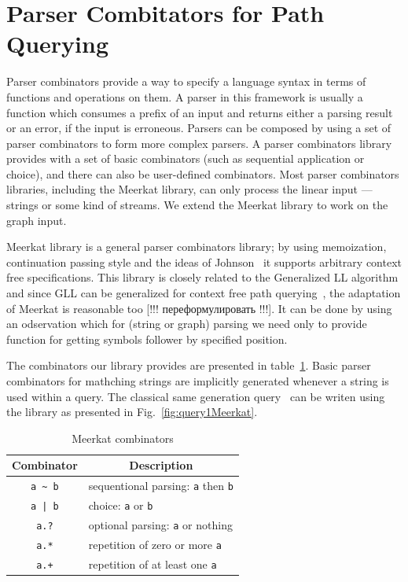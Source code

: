  \section{Parser Combitators for Path Querying}

Parser combinators provide a way to specify a language syntax in terms of functions and operations on them. 
A parser in this framework is usually a function which consumes a prefix of an input and returns either a parsing result or an error, if the input is erroneous. 
Parsers can be composed by using a set of parser combinators to form more complex parsers. 
A parser combinators library provides with a set of basic combinators (such as sequential application or choice), and there can also be user-defined combinators. 
Most parser combinators libraries, including the Meerkat library, can only process the linear input --- strings or some kind of streams. 
We extend the Meerkat library to work on the graph input.

Meerkat library is a general parser combinators library; by using memoization, continuation passing style and the ideas of Johnson~\cite{Johnson} it supports arbitrary context free specifications. 
This library is closely related to the Generalized LL algorithm and since GLL can be generalized for context free path querying~\cite{GrigorevR16}, the adaptation of Meerkat is reasonable too [!!! переформулировать !!!]. 
It can be done by using an odservation which for (string or graph) parsing we need only to provide function for getting symbols follower by specified position.

The combinators our library provides are presented in table~\ref{table:combinators}. 
Basic parser combinators for mathching strings are implicitly generated whenever a string is used within a query. 
The classical same generation query~\cite{FndDB} can be writen using the library as presented in Fig.~\ref{fig:query1Meerkat}.

\begin{table}[h]
\centering
\begin{tabular}{c|l}
\multicolumn{1}{c|}{Combinator} & \multicolumn{1}{|c}{Description} \\ \hline
{\lstinline!a ~ b!} & sequentional parsing: {\lstinline!a!} then {\lstinline!b!}   \\
{\lstinline!a | b!} & choice: {\lstinline!a!} or {\lstinline!b!}         \\
{\lstinline!a.?!}   & optional parsing: {\lstinline!a!} or nothing   \\
{\lstinline!a.*!}   & repetition of zero or more {\lstinline!a!} \\
{\lstinline!a.+!}   & repetition of at least one {\lstinline!a!} \\
\end{tabular}
\caption{Meerkat combinators}
\label{table:combinators}
\end{table}


